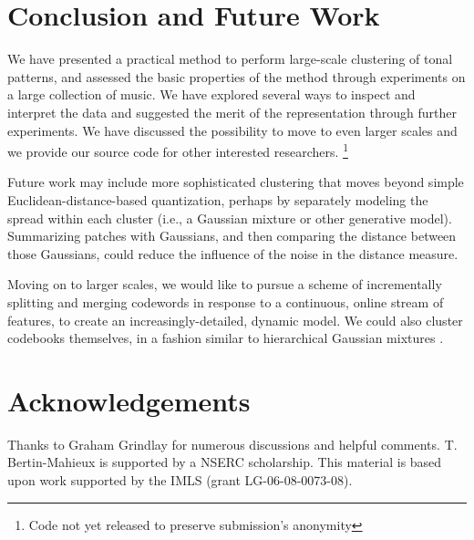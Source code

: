 \documentclass{article}
\begin{document}
\section{Conclusion and Future Work}
We have presented a practical method to perform large-scale clustering of
tonal patterns, and assessed the basic properties of the method through
experiments on a large collection of music. We have explored several ways
to inspect and interpret the data 
and suggested the merit of the representation
through further experiments.
We have discussed the possibility to move to even larger scales
and we provide our source code for other interested researchers.
\footnote{Code not yet released to preserve submission's anonymity}

Future work may include more sophisticated clustering that moves 
beyond simple Euclidean-distance-based quantization, perhaps 
by separately modeling the spread within each cluster (i.e., a Gaussian 
mixture or other generative model). 
Summarizing patches
with Gaussians, and then comparing the distance between those Gaussians,
could reduce the influence of the noise in the distance measure.

Moving on to larger scales, we would like to pursue a scheme of incrementally 
splitting and merging codewords in response to a continuous, online stream 
of features, to create an increasingly-detailed, dynamic model.  We could
also cluster codebooks themselves, in a fashion similar to hierarchical
Gaussian mixtures \cite{Vasconcelos2001}.


\section{Acknowledgements}
Thanks to Graham Grindlay for numerous discussions and helpful comments.
T. Bertin-Mahieux is supported by a NSERC scholarship.
This material is based upon work supported by the IMLS (grant LG-06-08-0073-08).




\end{document}
